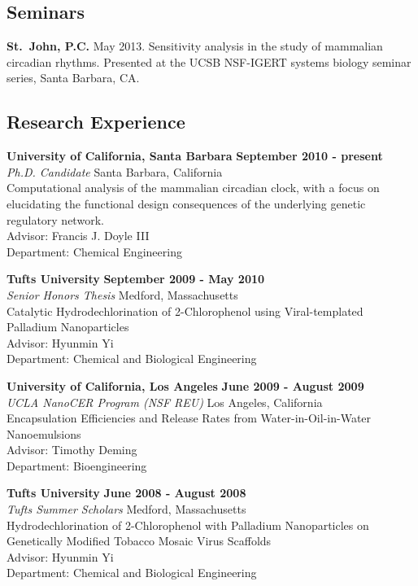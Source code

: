 {\subsection*{Seminars}
{\bfseries St.\ John, P.C.} May 2013. Sensitivity analysis in the study of
mammalian circadian rhythms. Presented at the UCSB NSF-IGERT systems biology
seminar series, Santa Barbara, CA.

\subsection*{Research Experience}

{\bf University of California, Santa Barbara} \hfill {\bf September 2010 - present}\\
{\em Ph.D. Candidate} \hfill Santa Barbara, California\\
Computational analysis of the mammalian circadian clock, with a focus on
elucidating the functional design consequences of the underlying genetic
regulatory network.\\
Advisor: Francis J. Doyle III \\
Department: Chemical Engineering

{\bf Tufts University} \hfill {\bf September 2009 - May 2010}\\
{\em Senior Honors Thesis} \hfill Medford, Massachusetts\\
Catalytic Hydrodechlorination of 2-Chlorophenol using Viral-templated Palladium Nanoparticles\\
Advisor: Hyunmin Yi \\
Department: Chemical and Biological Engineering

{\bf University of California, Los Angeles} \hfill {\bf June 2009 - August 2009}\\
{\em UCLA NanoCER Program (NSF REU)} \hfill Los Angeles, California\\
Encapsulation Efficiencies and Release Rates from Water-in-Oil-in-Water Nanoemulsions\\
Advisor: Timothy Deming\\
Department: Bioengineering

{\bf Tufts University} \hfill {\bf June 2008 - August 2008}\\
{\em Tufts Summer Scholars} \hfill Medford, Massachusetts\\
Hydrodechlorination of 2-Chlorophenol with Palladium Nanoparticles on Genetically Modified Tobacco Mosaic Virus Scaffolds\\
Advisor: Hyunmin Yi\\
Department: Chemical and Biological Engineering

}

